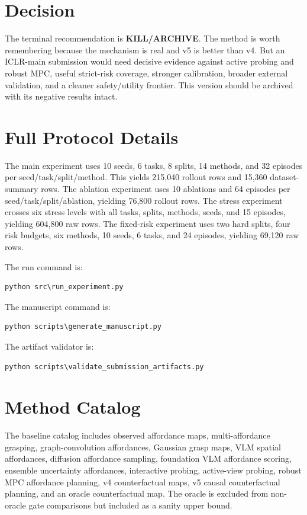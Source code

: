 \documentclass{article}
\newcommand{\terminal}{\textsc{KILL/ARCHIVE}}
\begin{document}
\section{Decision}
The terminal recommendation is \textbf{\terminal}. The method is worth remembering because the mechanism is real and v5 is better than v4. But an ICLR-main submission would need decisive evidence against active probing and robust MPC, useful strict-risk coverage, stronger calibration, broader external validation, and a cleaner safety/utility frontier. This version should be archived with its negative results intact.

\clearpage
\appendix

\section{Full Protocol Details}
The main experiment uses 10 seeds, 6 tasks, 8 splits, 14 methods, and 32 episodes per seed/task/split/method. This yields 215,040 rollout rows and 15,360 dataset-summary rows. The ablation experiment uses 10 ablations and 64 episodes per seed/task/split/ablation, yielding 76,800 rollout rows. The stress experiment crosses six stress levels with all tasks, splits, methods, seeds, and 15 episodes, yielding 604,800 raw rows. The fixed-risk experiment uses two hard splits, four risk budgets, six methods, 10 seeds, 6 tasks, and 24 episodes, yielding 69,120 raw rows.

The run command is:
\begin{verbatim}
python src\run_experiment.py
\end{verbatim}
The manuscript command is:
\begin{verbatim}
python scripts\generate_manuscript.py
\end{verbatim}
The artifact validator is:
\begin{verbatim}
python scripts\validate_submission_artifacts.py
\end{verbatim}

\section{Method Catalog}
The baseline catalog includes observed affordance maps, multi-affordance grasping, graph-convolution affordances, Gaussian grasp maps, VLM spatial affordances, diffusion affordance sampling, foundation VLM affordance scoring, ensemble uncertainty affordances, interactive probing, active-view probing, robust MPC affordance planning, v4 counterfactual maps, v5 causal counterfactual planning, and an oracle counterfactual map. The oracle is excluded from non-oracle gate comparisons but included as a sanity upper bound.
\end{document}

